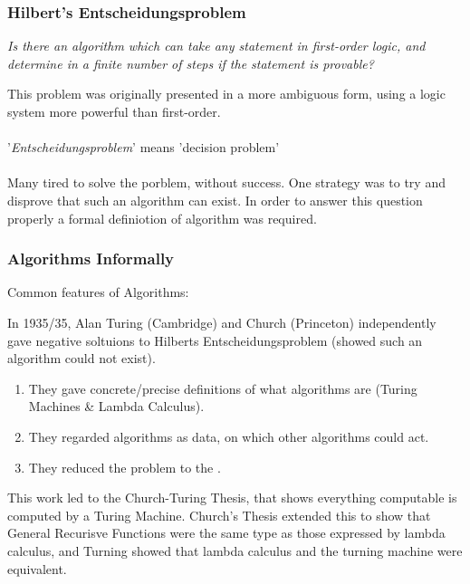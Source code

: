 \documentclass{report}
\newcommand{\cenqu}[1]{\begin{center}\textit{#1}\end{center}}
\begin{document}
\subsubsection*{Hilbert's Entscheidungsproblem}
\cenqu{Is there an algorithm which can take any statement in first-order logic, and determine in a finite number of steps if the statement is provable?}


This problem was originally presented in a more ambiguous form, using a logic system more powerful than first-order.
\\
\\ '\textit{Entscheidungsproblem}' means 'decision problem'
\\
\\ Many tired to solve the porblem, without success. One strategy was to try and disprove that such an algorithm can exist.
In order to answer this question properly a formal definiotion of algorithm was required.

\subsubsection*{Algorithms Informally}
Common features of Algorithms:
\begin{itemize}
\end{itemize}

In 1935/35, Alan Turing (Cambridge) and Church (Princeton) independently gave negative soltuions to Hilberts Entscheidungsproblem (showed such an algorithm could not exist).
\begin{enumerate}
	\item They gave concrete/precise definitions of what algorithms are (Turing Machines \& Lambda Calculus).
	\item They regarded algorithms as data, on which other algorithms could act.
	\item They reduced the problem to the .
\end{enumerate}
This work led to the Church-Turing Thesis, that shows everything computable is computed by a Turing Machine. Church's Thesis extended this to show that General Recurisve Functions were the same type as those expressed by lambda calculus, and Turning showed that lambda calculus and the turning machine were equivalent.
\end{document}
